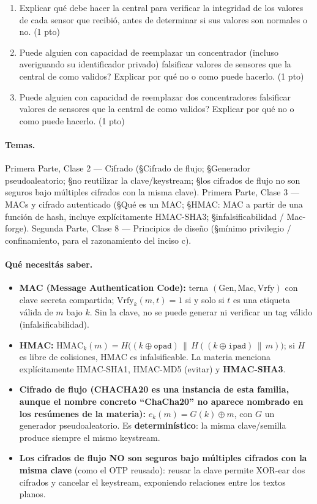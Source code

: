 \begin{consigna}
\begin{enumerate}
  \item[a)] Explicar qué debe hacer la central para verificar la integridad de los
  valores de cada sensor que recibió, antes de determinar si sus valores son normales o
  no. (1 pto)
  \item[b)] \textquestiondown{}Puede alguien con capacidad de reemplazar un concentrador (incluso
  averiguando su identificador privado) falsificar valores de sensores que la central
  de como validos? Explicar por qué no o como puede hacerlo. (1 pto)
  \item[c)] \textquestiondown{}Puede alguien con capacidad de reemplazar dos concentradores falsificar
  valores de sensores que la central de como validos? Explicar por qué no o como puede
  hacerlo. (1 pto)
\end{enumerate}
\end{consigna}

\paragraph{Temas.}
Primera Parte, Clase 2 --- Cifrado (\S Cifrado de flujo; \S Generador pseudoaleatorio;
\S no reutilizar la clave/keystream; \S los cifrados de flujo no son seguros bajo
múltiples cifrados con la misma clave). Primera Parte, Clase 3 --- MACs y cifrado
autenticado (\S Qué es un MAC; \S HMAC: MAC a partir de una función de hash, incluye
explícitamente HMAC-SHA3; \S infalsificabilidad / Mac-forge). Segunda Parte, Clase 8
--- Principios de diseño (\S mínimo privilegio / confinamiento, para el razonamiento
del inciso c).

\paragraph{Qué necesitás saber.}
\begin{itemize}
  \item \textbf{MAC (Message Authentication Code):} terna $(\mathrm{Gen},
  \mathrm{Mac}, \mathrm{Vrfy})$ con clave secreta compartida; $\mathrm{Vrfy}_k(m,t)=1$
  si y solo si $t$ es una etiqueta válida de $m$ bajo $k$. Sin la clave, no se puede
  generar ni verificar un tag válido (infalsificabilidad).
  \item \textbf{HMAC:} $\mathrm{HMAC}_k(m) = H\big((k\oplus\texttt{opad})\,\|\,
  H((k\oplus\texttt{ipad})\,\|\,m)\big)$; si $H$ es libre de colisiones, HMAC es
  infalsificable. La materia menciona explícitamente HMAC-SHA1, HMAC-MD5 (evitar) y
  \textbf{HMAC-SHA3}.
  \item \textbf{Cifrado de flujo (CHACHA20 es una instancia de esta familia, aunque el
  nombre concreto ``ChaCha20'' no aparece nombrado en los resúmenes de la materia):}
  $e_k(m) = G(k)\oplus m$, con $G$ un generador pseudoaleatorio. Es
  \textbf{determinístico}: la misma clave/semilla produce siempre el mismo keystream.
  \item \textbf{Los cifrados de flujo NO son seguros bajo múltiples cifrados con la
  misma clave} (como el OTP reusado): reusar la clave permite XOR-ear dos cifrados y
  cancelar el keystream, exponiendo relaciones entre los textos planos.
\end{itemize}

